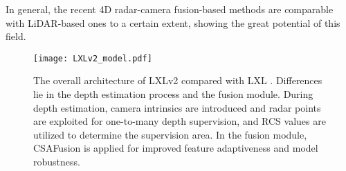 In general, the recent 4D radar-camera fusion-based methods are comparable with LiDAR-based ones to a certain extent, showing the great potential of this field.
\begin{figure*}
    \centering
    \texttt{[image: LXLv2\_model.pdf]} \vspace{-3mm}
    \caption{The overall architecture of LXLv2 compared with LXL \cite{LXL}. Differences lie in the depth estimation process and the fusion module. During depth estimation, camera intrinsics are introduced and radar points are exploited for one-to-many depth supervision, and RCS values are utilized to determine the supervision area. In the fusion module, CSAFusion is applied for improved feature adaptiveness and model robustness.}
    \label{fig:LXLv2} \vspace{-5mm}
\end{figure*}

\vspace{-3mm}